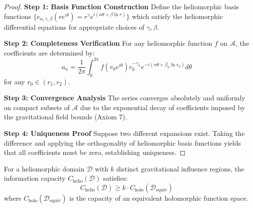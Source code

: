 \begin{proof}
\textbf{Step 1: Basis Function Construction}
Define the heliomorphic basis functions $\{e_{n,\gamma,\beta}(re^{i\theta}) = r^\gamma e^{i(n\theta + \beta \ln r)}\}$ which satisfy the heliomorphic differential equations for appropriate choices of $\gamma, \beta$.

\textbf{Step 2: Completeness Verification}
For any heliomorphic function $f$ on $\mathcal{A}$, the coefficients are determined by:
$$a_n = \frac{1}{2\pi} \int_0^{2\pi} f(r_0 e^{i\theta}) r_0^{-\gamma_n} e^{-i(n\theta + \beta_n \ln r_0)} d\theta$$
for any $r_0 \in (r_1, r_2)$.

\textbf{Step 3: Convergence Analysis}
The series converges absolutely and uniformly on compact subsets of $\mathcal{A}$ due to the exponential decay of coefficients imposed by the gravitational field bounds (Axiom 7).

\textbf{Step 4: Uniqueness Proof}
Suppose two different expansions exist. Taking the difference and applying the orthogonality of heliomorphic basis functions yields that all coefficients must be zero, establishing uniqueness.
\end{proof}

\begin{theorem}
\label{thm:information_capacity}
For a heliomorphic domain $\mathcal{D}$ with $k$ distinct gravitational influence regions, the information capacity $C_{\text{helio}}(\mathcal{D})$ satisfies:
$$C_{\text{helio}}(\mathcal{D}) \geq k \cdot C_{\text{holo}}(\mathcal{D}_{\text{equiv}})$$
where $C_{\text{holo}}(\mathcal{D}_{\text{equiv}})$ is the capacity of an equivalent holomorphic function space.
\end{theorem}

